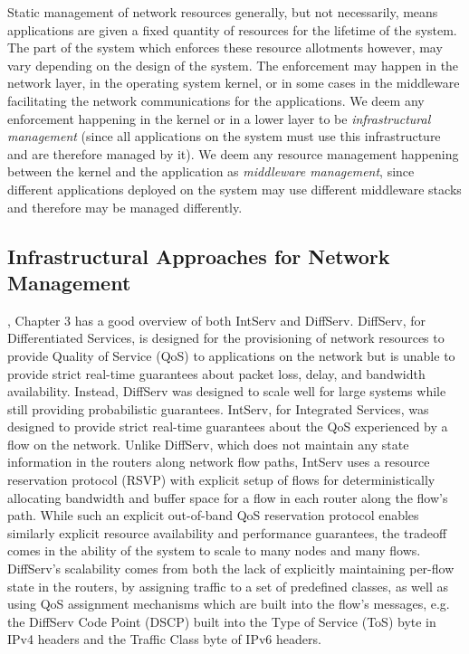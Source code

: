 Static management of network resources generally, but not necessarily,
means applications are given a fixed quantity of resources for the
lifetime of the system.  The part of the system which enforces these
resource allotments however, may vary depending on the design of the
system.  The enforcement may happen in the network layer, in the
operating system kernel, or in some cases in the middleware
facilitating the network communications for the applications.  We deem
any enforcement happening in the kernel or in a lower layer to be
\textit{infrastructural management} (since all applications on the
system must use this infrastructure and are therefore managed by it).
We deem any resource management happening between the kernel and the
application as \textit{middleware management}, since different
applications deployed on the system may use different middleware
stacks and therefore may be managed differently.


\subsection{Infrastructural Approaches for Network Management}
\label{subsec:related_part2_infrastructural}

\cite{QT_Giambene2005}, Chapter 3 has a good overview of both IntServ
and DiffServ.  DiffServ, for Differentiated Services, is designed for
the provisioning of network resources to provide Quality of Service
(QoS) to applications on the network but is unable to provide strict
real-time guarantees about packet loss, delay, and bandwidth
availability.  Instead, DiffServ was designed to scale well for large
systems while still providing probabilistic guarantees.  IntServ, for
Integrated Services, was designed to provide strict real-time
guarantees about the QoS experienced by a flow on the network.  Unlike
DiffServ, which does not maintain any state information in the routers
along network flow paths, IntServ uses a resource reservation protocol
(RSVP) with explicit setup of flows for deterministically allocating
bandwidth and buffer space for a flow in each router along the flow's
path.  While such an explicit out-of-band QoS reservation protocol
enables similarly explicit resource availability and performance
guarantees, the tradeoff comes in the ability of the system to scale
to many nodes and many flows.  DiffServ's scalability comes from both
the lack of explicitly maintaining per-flow state in the routers, by
assigning traffic to a set of predefined classes, as well as using QoS
assignment mechanisms which are built into the flow's messages,
e.g. the DiffServ Code Point (DSCP) built into the Type of Service
(ToS) byte in IPv4 headers and the Traffic Class byte of IPv6 headers.

